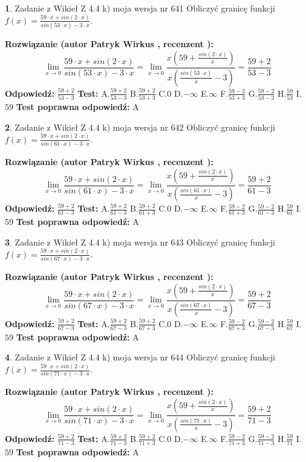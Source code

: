 \documentclass[12pt, a4paper]{article}
\theoremstyle{definition} %
\newtheorem{zad}{}
\newcommand{\zadStart}[1]{\begin{zad}#1\newline}
\newcommand{\zadStop}{\end{zad}}
\newcommand{\rozwStart}[2]{\noindent \textbf{Rozwiązanie (autor #1 , recenzent #2): }\newline}
\newcommand{\rozwStop}{\newline}
\newcommand{\odpStart}{\noindent \textbf{Odpowiedź:}\newline}
\newcommand{\odpStop}{\newline}
\newcommand{\testStart}{\noindent \textbf{Test:}\newline}
\newcommand{\testStop}{\newline}
\newcommand{\kluczStart}{\noindent \textbf{Test poprawna odpowiedź:}\newline}
\newcommand{\kluczStop}{\newline}
\begin{document}
\zadStart{Zadanie z Wikieł Z 4.4 k) moja wersja nr 641}
Obliczyć granicę funkcji $f(x)=\frac{59\cdot x +sin(2\cdot x)}{sin(53\cdot x) -3\cdot x}$.
\zadStop
\rozwStart{Patryk Wirkus}{}
$$\lim\limits_{x\to 0}\frac{59\cdot x +sin(2\cdot x)}{sin(53\cdot x) -3\cdot x}
=\lim\limits_{x\to 0}\frac{x(59+\frac{sin(2\cdot x)}{x})}{x(\frac{sin(53\cdot x)}{x}-3)}
=\frac{59+2}{53-3}$$
\rozwStop
\odpStart
$\frac{59+2}{53-3}$
\odpStop
\testStart
A.$\frac{59+2}{53-3}$
B.$\frac{59+2}{53+3}$
C.$0$
D.$-\infty$
E.$\infty$
F.$\frac{59-2}{53+3}$
G.$\frac{59-2}{53-3}$
H.$\frac{59}{53}$
I.$59$
\testStop
\kluczStart
A
\kluczStop



\zadStart{Zadanie z Wikieł Z 4.4 k) moja wersja nr 642}
Obliczyć granicę funkcji $f(x)=\frac{59\cdot x +sin(2\cdot x)}{sin(61\cdot x) -3\cdot x}$.
\zadStop
\rozwStart{Patryk Wirkus}{}
$$\lim\limits_{x\to 0}\frac{59\cdot x +sin(2\cdot x)}{sin(61\cdot x) -3\cdot x}
=\lim\limits_{x\to 0}\frac{x(59+\frac{sin(2\cdot x)}{x})}{x(\frac{sin(61\cdot x)}{x}-3)}
=\frac{59+2}{61-3}$$
\rozwStop
\odpStart
$\frac{59+2}{61-3}$
\odpStop
\testStart
A.$\frac{59+2}{61-3}$
B.$\frac{59+2}{61+3}$
C.$0$
D.$-\infty$
E.$\infty$
F.$\frac{59-2}{61+3}$
G.$\frac{59-2}{61-3}$
H.$\frac{59}{61}$
I.$59$
\testStop
\kluczStart
A
\kluczStop



\zadStart{Zadanie z Wikieł Z 4.4 k) moja wersja nr 643}
Obliczyć granicę funkcji $f(x)=\frac{59\cdot x +sin(2\cdot x)}{sin(67\cdot x) -3\cdot x}$.
\zadStop
\rozwStart{Patryk Wirkus}{}
$$\lim\limits_{x\to 0}\frac{59\cdot x +sin(2\cdot x)}{sin(67\cdot x) -3\cdot x}
=\lim\limits_{x\to 0}\frac{x(59+\frac{sin(2\cdot x)}{x})}{x(\frac{sin(67\cdot x)}{x}-3)}
=\frac{59+2}{67-3}$$
\rozwStop
\odpStart
$\frac{59+2}{67-3}$
\odpStop
\testStart
A.$\frac{59+2}{67-3}$
B.$\frac{59+2}{67+3}$
C.$0$
D.$-\infty$
E.$\infty$
F.$\frac{59-2}{67+3}$
G.$\frac{59-2}{67-3}$
H.$\frac{59}{67}$
I.$59$
\testStop
\kluczStart
A
\kluczStop



\zadStart{Zadanie z Wikieł Z 4.4 k) moja wersja nr 644}
Obliczyć granicę funkcji $f(x)=\frac{59\cdot x +sin(2\cdot x)}{sin(71\cdot x) -3\cdot x}$.
\zadStop
\rozwStart{Patryk Wirkus}{}
$$\lim\limits_{x\to 0}\frac{59\cdot x +sin(2\cdot x)}{sin(71\cdot x) -3\cdot x}
=\lim\limits_{x\to 0}\frac{x(59+\frac{sin(2\cdot x)}{x})}{x(\frac{sin(71\cdot x)}{x}-3)}
=\frac{59+2}{71-3}$$
\rozwStop
\odpStart
$\frac{59+2}{71-3}$
\odpStop
\testStart
A.$\frac{59+2}{71-3}$
B.$\frac{59+2}{71+3}$
C.$0$
D.$-\infty$
E.$\infty$
F.$\frac{59-2}{71+3}$
G.$\frac{59-2}{71-3}$
H.$\frac{59}{71}$
I.$59$
\testStop
\kluczStart
A
\kluczStop
\end{document}
